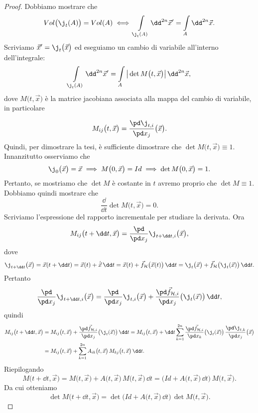 \begin{proof}
	Dobbiamo mostrare che
	\[
		Vol\big(\j_t(A)\big) = Vol(A) \iff \int\limits_{\j_t(A)}\dd^{2n}\vec{x}' = \int\limits_A \dd^{2n}\vec{x}.
	\]
	Scriviamo \(\vec{x}' = \j_t\big(\vec{x}\big)\) ed eseguiamo un cambio di variabile all'interno dell'integrale:
	\[
		\int\limits_{\j_t(A)}\dd^{2n}\vec{x}' = \int\limits_A \big\lvert\det M\big(t,\vec{x}\big)\big\rvert\,\dd^{2n}\vec{x},
	\]
	dove \(M\big(t,\vec{x}\big)\) è la matrice jacobiana associata alla mappa del cambio di variabile, in particolare
	
	\[
		M_{ij}\big(t,\vec{x}\big) = \frac{\pd\j_{t,i}}{\pd x_j}\big(\vec{x}\big).
	\]
	Quindi, per dimostrare la tesi, è sufficiente dimostrare che \(\det M\big(t,\vec{x}\big) \equiv 1\). Innanzitutto osserviamo che
	\[
		\j_0\big(\vec{x}\big) = \vec{x} \implies M\big(0,\vec{x}\big) = Id \implies \det M\big(0,\vec{x}\big) = 1.
	\]
	Pertanto, se mostriamo che \(\det M\) è costante in \(t\) avremo proprio che \(\det M \equiv 1\). Dobbiamo quindi mostrare che
	\[
		\frac{\dd}{\dd t}\det M\big(t,\vec{x}\big) = 0.
	\]
	Scriviamo l'espressione del rapporto incrementale per studiare la derivata. Ora
	\[
		M_{ij}\big(t+\dd t,\vec{x}\big) = \frac{\pd}{\pd x_j}\j_{t+\dd t,i}\big(\vec{x}\big),
	\]
	dove
	\[
		\j_{t+\dd t}\big(\vec{x}\big) = \vec{x}(t+\dd t) = \vec{x}(t)+\dot{\vec{x}}\,\dd t = \vec{x}(t)+\vec{f}_{\mathcal{H}}\big(\vec{x}(t)\big)\,\dd t = \j_t\big(\vec{x}\big) + \vec{f}_{\mathcal{H}}\big(\j_t(\vec{x})\big)\,\dd t.
	\]
	Pertanto
	\[
		\frac{\pd}{\pd x_j}\j_{t+\dd t,i}\big(\vec{x}\big) = \frac{\pd}{\pd x_j}\j_{t,i}\big(\vec{x}\big) + \frac{\pd\vec{f}_{\mathcal{H},i}}{\pd x_j}\big(\j_t(\vec{x})\big)\,\dd t,
	\]
	quindi
	\[
		\begin{split}
			M_{ij}\big(t+\dd t,\vec{x}\big) & = M_{ij}\big(t,\vec{x}\big) + \frac{\pd\vec{f}_{\mathcal{H},i}}{\pd x_j}\big(\j_t(\vec{x})\big)\,\dd t = M_{ij}\big(t,\vec{x}\big) + \dd t \sum_{k=1}^{2n} \frac{\pd\vec{f}_{\mathcal{H},i}}{\pd x_k}\big(\j_t(\vec{x})\big)\,\frac{\pd\j_{t,k}}{\pd x_j}\big(\vec{x}\big)\\
			& = M_{ij}\big(t,\vec{x}\big) + \sum_{k=1}^{2n} A_{ik}\big(t,\vec{x}\big)\,M_{kj}\big(t,\vec{x}\big)\,\dd t.
		\end{split}
	\]
	Riepilogando
	\[
		M\big(t+\dd t,\vec{x}\big) = M\big(t,\vec{x}\big) + A\big(t,\vec{x}\big)\,M\big(t,\vec{x}\big)\,\dd t = \Big(Id+A\big(t,\vec{x}\big)\,\dd t\Big)\,M\big(t,\vec{x}\big).
	\]
	Da cui otteniamo
	\[
		\det M\big(t+\dd t,\vec{x}\big) = \det\Big(Id+A\big(t,\vec{x}\big)\,\dd t\Big)\,\det M\big(t,\vec{x}\big).
\]
\end{proof}
